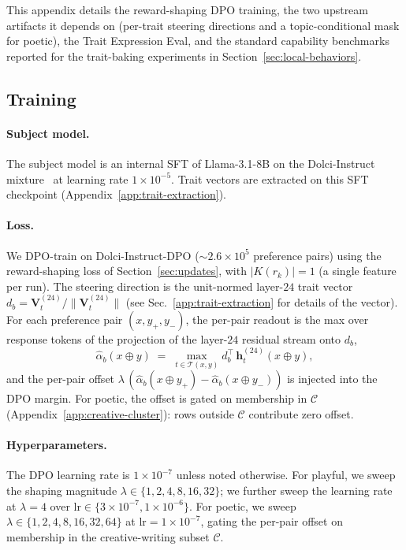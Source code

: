 \documentclass{article} %
\begin{document}
This appendix details the reward-shaping DPO training, the two upstream
artifacts it depends on (per-trait steering directions and a
topic-conditional mask for poetic), the Trait Expression Eval, and the
standard capability benchmarks reported for the trait-baking experiments
in Section~\ref{sec:local-behaviors}.

\subsection{Training}

\paragraph{Subject model.}
The subject model is an internal SFT of Llama-3.1-8B on the
Dolci-Instruct mixture~\citep{olmo2025olmo} at learning rate
$1{\times}10^{-5}$. Trait vectors are extracted on this SFT
checkpoint (Appendix~\ref{app:trait-extraction}).

\paragraph{Loss.}
We DPO-train on Dolci-Instruct-DPO ($\sim\!2.6{\times}10^{5}$
preference pairs) using the reward-shaping loss of
Section~\ref{sec:updates}, with $|K(r_k)|{=}1$ (a single feature per
run). The steering direction is the unit-normed layer-$24$ trait
vector
$d_b = \mathbf{V}_t^{(24)} / \|\mathbf{V}_t^{(24)}\|$ (see Sec.~\ref{app:trait-extraction} for details of the vector). For each
preference pair $(x, y_+, y_-)$, the per-pair readout is the max over
response tokens of the projection of the layer-$24$ residual stream
onto $d_b$,
\begin{equation}
\widehat{\alpha}_b(x{\oplus}y) \;=\;
\max_{t \in \mathcal{T}(x,y)} d_b^{\top}\, \mathbf{h}_t^{(24)}(x{\oplus}y),
\end{equation}
and the per-pair offset
$\lambda\,(\widehat{\alpha}_b(x{\oplus}y_+) -
\widehat{\alpha}_b(x{\oplus}y_-))$ is injected into the DPO margin.
For poetic, the offset is gated on membership in $\mathcal{C}$
(Appendix~\ref{app:creative-cluster}): rows outside $\mathcal{C}$
contribute zero offset.

\paragraph{Hyperparameters.}
The DPO learning rate is $1{\times}10^{-7}$ unless noted otherwise.
For playful, we sweep the shaping magnitude
$\lambda \in \{1, 2, 4, 8, 16, 32\}$; we further sweep the learning
rate at $\lambda{=}4$ over
$\text{lr} \in \{3{\times}10^{-7}, 1{\times}10^{-6}\}$. For poetic,
we sweep $\lambda \in \{1, 2, 4, 8, 16, 32, 64\}$ at
$\text{lr}{=}1{\times}10^{-7}$, gating the per-pair offset on
membership in the creative-writing subset $\mathcal{C}$.
\end{document}
